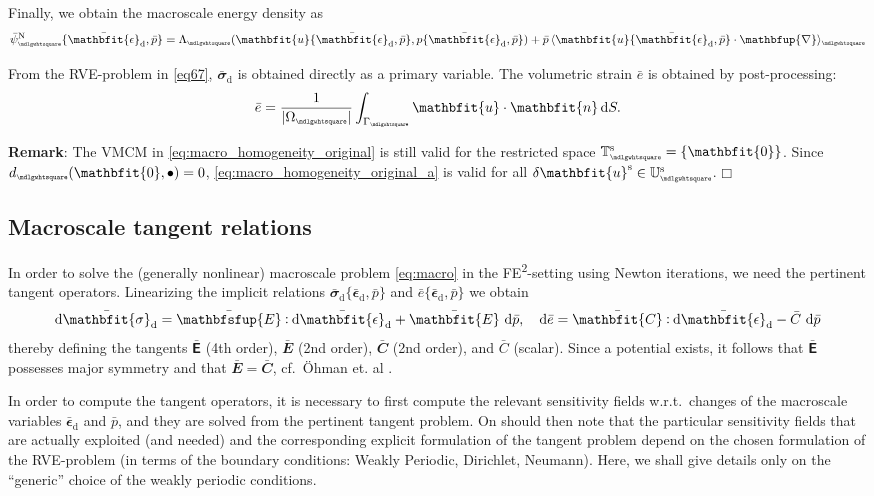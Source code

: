 \documentclass[12pt,a4paper]{article}
\renewcommand{\ta}[1]{\mathbfit{#1}}
\renewcommand{\ts}[1]{\mathbfit{#1}}
\renewcommand{\tf}[1]{\mathbfsfup{#1}}
\renewcommand{\diff}{\mathbfup{\nabla}}
\renewcommand{\Box}{\mdlgwhtsquare}
\DeclarePairedDelimiter{\homgen}{\langle}{\rangle_\rve}
\renewcommand{\dev}{\mathrm{d}}
\newcommand{\volume}{|\Omega_\rve|}
\newcommand{\epspargs}{\{{\bar{\ts\epsilon}}_\dev, \bar{p}\}}
\newcommand{\rve}{
  {\mathchoice
   {\mbox{\scalebox{0.67}{$\Box$}}}
   {\mbox{\scalebox{0.67}{$\Box$}}}
   {\mbox{\scalebox{0.5}{$\Box$}}}
   {\mbox{\scalebox{0.375}{$\Box$}}}
  }
}
\begin{document}
Finally, we obtain the macroscale energy density as
\begin{equation}
    \bar{\psi}_\rve^\Neumann\epspargs =
    \Lambda_\rve(\ta{u}\epspargs,p\epspargs) + \bar{p}\,\homgen{ \ta{u}\epspargs\cdot\diff }
\label{eq105}
\end{equation}

From the RVE-problem in \cref{eq67}, $\bar{\ts\sigma}_\dev$ is obtained directly as a primary variable.
The volumetric strain $\bar{e}$ is obtained by post-processing:
\begin{align}
 \bar{e} = \frac{1}{\volume} \int_{\Gamma_\rve} \ta u \cdot \ta n\dif S.
\end{align}

\textbf{Remark}:
The VMCM in \cref{eq:macro_homogeneity_original} is still valid for the restricted space $\set{T}_\rve^\fluct = \{\ta 0\}$.
Since $d_\rve(\ta 0, \bullet) = 0$, \cref{eq:macro_homogeneity_original_a} is valid for all $\delta\ta u^\fluct \in \set U_\rve^\fluct$. $\Box$


\subsection{Macroscale tangent relations}
In order to solve the (generally nonlinear) macroscale problem \cref{eq:macro} in the FE\textsuperscript{2}-setting using Newton iterations, we need the pertinent tangent operators.
Linearizing the implicit relations $\bar{\ts\sigma}_\dev\epspargs$ and $\bar{e}\epspargs$ we obtain
\begin{align}
 \dif\bar{\ts\sigma}_\dev = \bar{\tf E} \dprod \dif\bar{\ts\epsilon}_\dev + \bar{\ts E}\, \dif\bar{p},
\quad
 \dif\bar{e} = \bar{\ts C} \dprod \dif\bar{\ts\epsilon}_\dev - \bar{C}\, \dif\bar{p}
\label{eq:periodic_difsigma}
\end{align}
thereby defining the tangents $\bar{\tf E}$ (4th order), $\bar{\ts E}$ (2nd order), $\bar{\ts C}$ (2nd order), and $\bar{C}$ (scalar).
Since a potential exists, it follows that $\bar{\tf {E}}$ possesses major symmetry and that $\bar{\ts E} = \bar{\ts C}$, cf.\ \"Ohman et. al \cite{ohman_computational_2012}.

In order to compute the tangent operators, it is necessary to first compute the relevant sensitivity fields w.r.t.\ changes of the macroscale variables $\bar{\ts\epsilon}_\dev$ and $\bar{p}$, and they are solved from the pertinent tangent problem.
On should then note that the particular sensitivity fields that are actually exploited (and needed) and the corresponding explicit formulation of the tangent problem depend on the chosen formulation of the RVE-problem (in terms of the boundary conditions: Weakly Periodic, Dirichlet, Neumann). 
Here, we shall give details only on the ``generic'' choice of the weakly periodic conditions.
\end{document}
